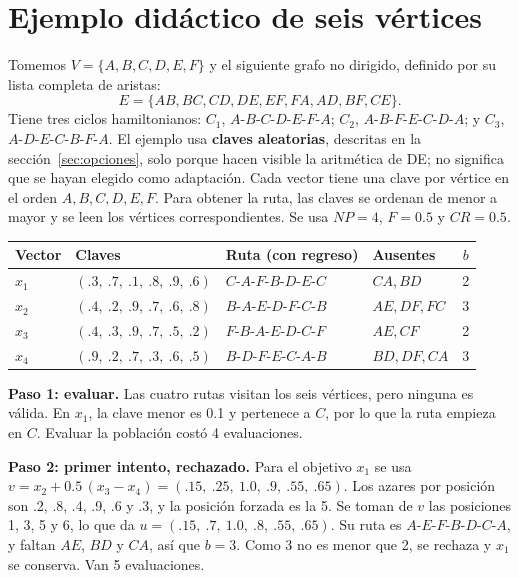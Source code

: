 \documentclass[letterpaper,12pt]{report}
\begin{document}
\section{Ejemplo didáctico de seis vértices}\label{sec:ejemplo}
Tomemos $V=\{A,B,C,D,E,F\}$ y el siguiente grafo no dirigido, definido por su lista completa de aristas:
\[
E=\{AB,BC,CD,DE,EF,FA,AD,BF,CE\}.
\]
Tiene tres ciclos hamiltonianos: $C_1$, $A\text{-}B\text{-}C\text{-}D\text{-}E\text{-}F\text{-}A$; $C_2$, $A\text{-}B\text{-}F\text{-}E\text{-}C\text{-}D\text{-}A$; y $C_3$, $A\text{-}D\text{-}E\text{-}C\text{-}B\text{-}F\text{-}A$. El ejemplo usa \textbf{claves aleatorias}, descritas en la sección~\ref{sec:opciones}, solo porque hacen visible la aritmética de DE; no significa que se hayan elegido como adaptación. Cada vector tiene una clave por vértice en el orden $A,B,C,D,E,F$. Para obtener la ruta, las claves se ordenan de menor a mayor y se leen los vértices correspondientes. Se usa $NP=4$, $F=0.5$ y $CR=0.5$.

\begin{center}
\small
\begin{tabular}{@{}lP{5cm}P{4.3cm}P{3cm}c@{}}
\toprule
\textbf{Vector} & \textbf{Claves} & \textbf{Ruta (con regreso)} & \textbf{Ausentes} & $b$\\
\midrule
$x_1$ & $(.3,\ .7,\ .1,\ .8,\ .9,\ .6)$ & $C\text{-}A\text{-}F\text{-}B\text{-}D\text{-}E\text{-}C$ & $CA,BD$ & 2\\
$x_2$ & $(.4,\ .2,\ .9,\ .7,\ .6,\ .8)$ & $B\text{-}A\text{-}E\text{-}D\text{-}F\text{-}C\text{-}B$ & $AE,DF,FC$ & 3\\
$x_3$ & $(.4,\ .3,\ .9,\ .7,\ .5,\ .2)$ & $F\text{-}B\text{-}A\text{-}E\text{-}D\text{-}C\text{-}F$ & $AE,CF$ & 2\\
$x_4$ & $(.9,\ .2,\ .7,\ .3,\ .6,\ .5)$ & $B\text{-}D\text{-}F\text{-}E\text{-}C\text{-}A\text{-}B$ & $BD,DF,CA$ & 3\\
\bottomrule
\end{tabular}
\end{center}

\noindent\textbf{Paso 1: evaluar.} Las cuatro rutas visitan los seis vértices, pero ninguna es válida. En $x_1$, la clave menor es 0.1 y pertenece a $C$, por lo que la ruta empieza en $C$. Evaluar la población costó 4 evaluaciones.

\noindent\textbf{Paso 2: primer intento, rechazado.} Para el objetivo $x_1$ se usa $v=x_2+0.5\,(x_3-x_4)=(.15,\ .25,\ 1.0,\ .9,\ .55,\ .65)$. Los azares por posición son .2, .8, .4, .9, .6 y .3, y la posición forzada es la 5. Se toman de $v$ las posiciones 1, 3, 5 y 6, lo que da $u=(.15,\ .7,\ 1.0,\ .8,\ .55,\ .65)$. Su ruta es $A\text{-}E\text{-}F\text{-}B\text{-}D\text{-}C\text{-}A$, y faltan $AE$, $BD$ y $CA$, así que $b=3$. Como 3 no es menor que 2, se rechaza y $x_1$ se conserva. Van 5 evaluaciones.
\end{document}
